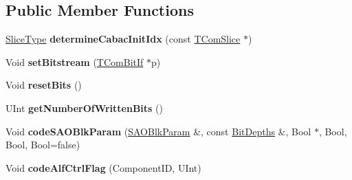 \subsection*{Public Member Functions}
\begin{DoxyCompactItemize}
\item 
\mbox{\label{class_t_enc_cavlc_ab67d6ca4a6a378bce9041c910dc73eb9}} 
\hyperlink{_type_def_8h_a8fc5fd31653a387f7430d29863620f71}{Slice\+Type} {\bfseries determine\+Cabac\+Init\+Idx} (const \hyperlink{class_t_com_slice}{T\+Com\+Slice} $\ast$)
\item 
\mbox{\label{class_t_enc_cavlc_ac7dfff3a64f4fef7bd246d90ac53ac21}} 
Void {\bfseries set\+Bitstream} (\hyperlink{class_t_com_bit_if}{T\+Com\+Bit\+If} $\ast$p)
\item 
\mbox{\label{class_t_enc_cavlc_a57f6113599b2c1d50df6e065ce39a7dd}} 
Void {\bfseries reset\+Bits} ()
\item 
\mbox{\label{class_t_enc_cavlc_a202d8dc2308e2d25cce86933ac407633}} 
U\+Int {\bfseries get\+Number\+Of\+Written\+Bits} ()
\item 
\mbox{\label{class_t_enc_cavlc_a9866248c371a495a8945719094afbfc7}} 
Void {\bfseries code\+S\+A\+O\+Blk\+Param} (\hyperlink{struct_s_a_o_blk_param}{S\+A\+O\+Blk\+Param} \&, const \hyperlink{struct_bit_depths}{Bit\+Depths} \&, Bool $\ast$, Bool, Bool, Bool=false)
\item 
\mbox{\label{class_t_enc_cavlc_a283ff7bd6ff34bb10d3c24c62ce7b96b}} 
Void {\bfseries code\+Alf\+Ctrl\+Flag} (Component\+ID, U\+Int)
\end{DoxyCompactItemize}
